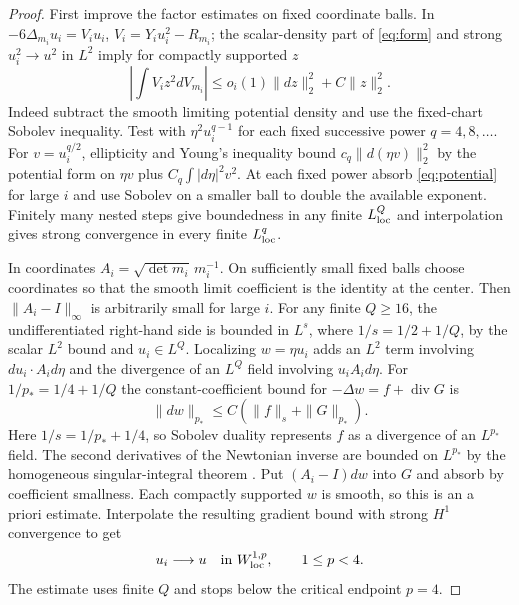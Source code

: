 \documentclass[11pt]{article}
\theoremstyle{definition}
\theoremstyle{remark}
\begin{document}
\begin{proof}
First improve the factor estimates on fixed coordinate balls. In \(-6\Delta_{m_i}u_i=V_i u_i\), \(V_i=Y_i u_i^2-R_{m_i}\); the scalar-density part of \eqref{eq:form} and strong \(u_i^2\to u^2\) in \(L^2\) imply for compactly supported \(z\)
\begin{equation}\label{eq:potential}
 \left|\int V_i z^2dV_{m_i}\right|
     \le o_i(1)\|dz\|_2^2+C\|z\|_2^2 .
\end{equation}
Indeed subtract the smooth limiting potential density and use the fixed-chart Sobolev inequality. Test with \(\eta^2u_i^{q-1}\) for each fixed successive power \(q=4,8,\ldots\). For \(v=u_i^{q/2}\), ellipticity and Young's inequality bound \(c_q\|d(\eta v)\|_2^2\) by the potential form on \(\eta v\) plus \(C_q\int |d\eta|^2v^2\). At each fixed power absorb \eqref{eq:potential} for large \(i\) and use Sobolev on a smaller ball to double the available exponent. Finitely many nested steps give boundedness in any finite \(L^Q_{\rm loc}\) and interpolation gives strong convergence in every finite \(L^q_{\rm loc}\).

In coordinates \(A_i=\sqrt{\det m_i}\,m_i^{-1}\). On sufficiently small fixed balls choose coordinates so that the smooth limit coefficient is the identity at the center. Then \(\|A_i-I\|_\infty\) is arbitrarily small for large \(i\). For any finite \(Q\ge16\), the undifferentiated right-hand side is bounded in \(L^s\), where \(1/s=1/2+1/Q\), by the scalar \(L^2\) bound and \(u_i\in L^Q\). Localizing \(w=\eta u_i\) adds an \(L^2\) term involving \(du_i\cdot A_i d\eta\) and the divergence of an \(L^Q\) field involving \(u_i A_i d\eta\). For \(1/p_*=1/4+1/Q\) the constant-coefficient bound for \(-\Delta w=f+\operatorname{div}G\) is
\[
 \|dw\|_{p_*}\le C(\|f\|_s+\|G\|_{p_*}) .
\]
Here \(1/s=1/p_*+1/4\), so Sobolev duality represents \(f\) as a divergence of an \(L^{p_*}\) field. The second derivatives of the Newtonian inverse are bounded on \(L^{p_*}\) by the homogeneous singular-integral theorem \cite[Chapter I, Theorem 1]{CalderonZygmund1952Singular}. Put \((A_i-I)dw\) into \(G\) and absorb by coefficient smallness. Each compactly supported \(w\) is smooth, so this is an a priori estimate. Interpolate the resulting gradient bound with strong \(H^1\) convergence to get
\begin{equation}\label{eq:p-gradient}
 u_i\longrightarrow u\quad\text{in }W^{1,p}_{\rm loc},
 \qquad 1\le p<4.
\end{equation}
The estimate uses finite \(Q\) and stops below the critical endpoint \(p=4\).


\end{proof}
\end{document}
